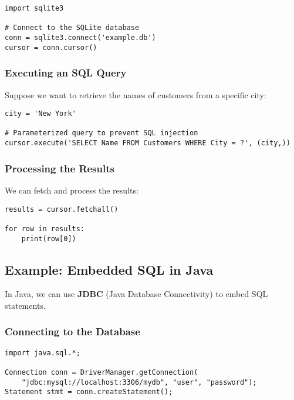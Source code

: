 \documentclass[12pt]{article}
\begin{document}
\begin{lstlisting}[style=PythonStyle]
import sqlite3

# Connect to the SQLite database
conn = sqlite3.connect('example.db')
cursor = conn.cursor()
\end{lstlisting}

\subsubsection*{Executing an SQL Query}

Suppose we want to retrieve the names of customers from a specific city:

\begin{lstlisting}[style=PythonStyle]
city = 'New York'

# Parameterized query to prevent SQL injection
cursor.execute('SELECT Name FROM Customers WHERE City = ?', (city,))
\end{lstlisting}

\subsubsection*{Processing the Results}

We can fetch and process the results:

\begin{lstlisting}[style=PythonStyle]
results = cursor.fetchall()

for row in results:
    print(row[0])
\end{lstlisting}

\subsection*{Example: Embedded SQL in Java}

In Java, we can use \textbf{JDBC} (Java Database Connectivity) to embed SQL statements.

\subsubsection*{Connecting to the Database}

\begin{lstlisting}[style=JavaStyle]
import java.sql.*;

Connection conn = DriverManager.getConnection(
    "jdbc:mysql://localhost:3306/mydb", "user", "password");
Statement stmt = conn.createStatement();
\end{lstlisting}
\end{document}
